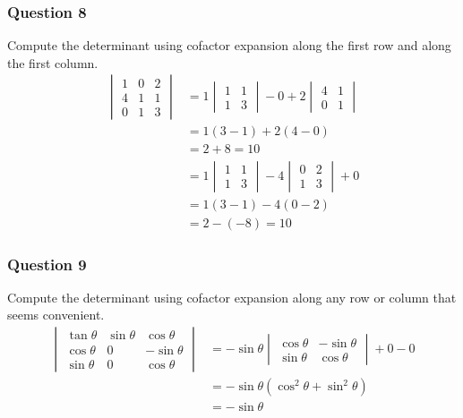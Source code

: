 \documentclass{math}
\begin{document}
\subsubsection*{Question 8}
Compute the determinant using cofactor expansion along the first row and along
the first column.
\begin{align*}
  \begin{vmatrix}
    1 & 0 & 2 \\
    4 & 1 & 1 \\
    0 & 1 & 3
  \end{vmatrix} &= 1\begin{vmatrix}
    1 & 1 \\
    1 & 3
  \end{vmatrix}-0+2\begin{vmatrix}
    4 & 1 \\
    0 & 1
  \end{vmatrix} \\
  &= 1(3-1)+2(4-0) \\
  &= 2+8 = 10 \\
  &= 1\begin{vmatrix}
    1 & 1 \\
    1 & 3
  \end{vmatrix}-4\begin{vmatrix}
    0 & 2 \\
    1 & 3
  \end{vmatrix}+0 \\
  &= 1(3-1)-4(0-2) \\
  &= 2-(-8) = 10
\end{align*}

\subsubsection*{Question 9}
Compute the determinant using cofactor expansion along any row or column that
seems convenient.
\begin{align*}
  \begin{vmatrix}
    \tan\theta & \sin\theta & \cos\theta \\
    \cos\theta & 0 & -\sin\theta \\
    \sin\theta & 0 & \cos\theta
  \end{vmatrix} &= -\sin\theta\begin{vmatrix}
    \cos\theta & -\sin\theta \\
    \sin\theta & \cos\theta
  \end{vmatrix}+0-0 \\
  &= -\sin\theta(\cos^2\theta+\sin^2\theta) \\
  &= -\sin\theta
\end{align*}
\end{document}
